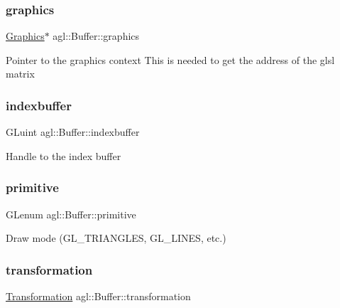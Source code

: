 \subsubsection{\texorpdfstring{graphics}{graphics}}
{\footnotesize\ttfamily \mbox{\hyperlink{classagl_1_1Graphics}{Graphics}}$\ast$ agl\+::\+Buffer\+::graphics\hspace{0.3cm}{\ttfamily [private]}}

Pointer to the graphics context This is needed to get the address of the glsl matrix \mbox{\label{classagl_1_1Buffer_a6a3afd93e5f0f3c7aa2ba163537ad6fc}} 
\subsubsection{\texorpdfstring{indexbuffer}{indexbuffer}}
{\footnotesize\ttfamily G\+Luint agl\+::\+Buffer\+::indexbuffer\hspace{0.3cm}{\ttfamily [private]}}

Handle to the index buffer \mbox{\label{classagl_1_1Buffer_a58c9e34d415980f2e19b8774ddac22dc}} 
\subsubsection{\texorpdfstring{primitive}{primitive}}
{\footnotesize\ttfamily G\+Lenum agl\+::\+Buffer\+::primitive\hspace{0.3cm}{\ttfamily [private]}}

Draw mode (G\+L\+\_\+\+T\+R\+I\+A\+N\+G\+L\+ES, G\+L\+\_\+\+L\+I\+N\+ES, etc.) \mbox{\label{classagl_1_1Buffer_a958d8a9c8719b13f7aa2efb0879bf962}} 
\subsubsection{\texorpdfstring{transformation}{transformation}}
{\footnotesize\ttfamily \mbox{\hyperlink{classagl_1_1Transformation}{Transformation}} agl\+::\+Buffer\+::transformation\hspace{0.3cm}{\ttfamily [private]}}

